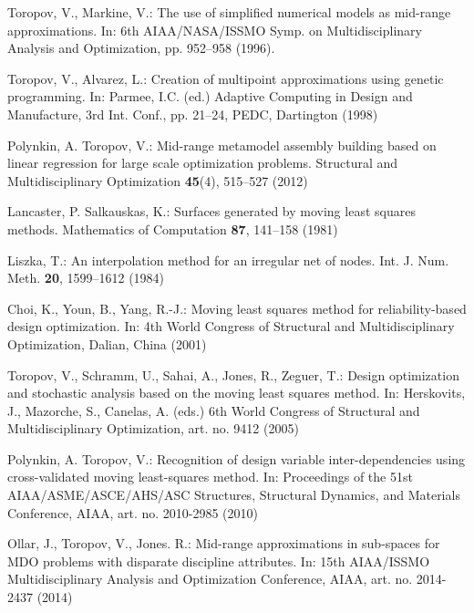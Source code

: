 \documentclass[runningheads,a4paper]{llncs}
\begin{document}
\begin{thebibliography}{10}
Toropov, V., Markine, V.:
\newblock The use of simplified numerical models as mid-range approximations.
\newblock In: 6th AIAA/NASA/ISSMO Symp. on Multidisciplinary Analysis and Optimization, pp. 952--958 (1996).

Toropov, V., Alvarez, L.:
\newblock Creation of multipoint approximations using genetic programming.
\newblock In: Parmee, I.C. (ed.) Adaptive Computing in Design and Manufacture, 3rd Int. Conf.,
   pp. 21--24, PEDC, Dartington (1998)

Polynkin, A. Toropov, V.:
\newblock Mid-range metamodel assembly building based on linear regression for large scale optimization problems.
\newblock Structural and Multidisciplinary Optimization \textbf{45}(4), 515--527 (2012)

Lancaster, P. Salkauskas, K.:
\newblock Surfaces generated by moving least squares methods.
\newblock Mathematics of Computation \textbf{87}, 141--158 (1981)

Liszka, T.:
\newblock An interpolation method for an irregular net of nodes.
\newblock Int. J. Num. Meth. \textbf{20}, 1599--1612 (1984)

Choi, K., Youn, B., Yang, R.-J.:
\newblock Moving least squares method for reliability-based design optimization.
\newblock In: 4th World Congress of Structural and Multidisciplinary Optimization, Dalian, China (2001)

Toropov, V., Schramm, U., Sahai, A., Jones, R., Zeguer, T.:
\newblock Design optimization and stochastic analysis based on the moving least squares method.
\newblock In: Herskovits, J., Mazorche, S., Canelas, A. (eds.) 6th World Congress of Structural and Multidisciplinary Optimization, art. no. 9412 (2005)

Polynkin, A. Toropov, V.:
\newblock Recognition of design variable inter-dependencies using  cross-validated moving least-squares method.
\newblock In: Proceedings of the 51st AIAA/ASME/ASCE/AHS/ASC Structures, Structural Dynamics, and Materials Conference, AIAA, art. no. 2010-2985 (2010)

Ollar, J., Toropov, V., Jones. R.:
\newblock  Mid-range approximations in sub-spaces for MDO problems with disparate discipline attributes.
\newblock In: 15th AIAA/ISSMO Multidisciplinary Analysis and Optimization Conference, AIAA, art. no. 2014-2437 (2014)


\end{thebibliography}
\end{document}
